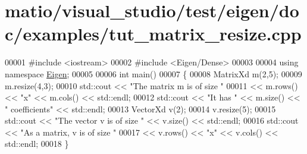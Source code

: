 \hypertarget{matio_2visual__studio_2test_2eigen_2doc_2examples_2tut__matrix__resize_8cpp_source}{}\section{matio/visual\+\_\+studio/test/eigen/doc/examples/tut\+\_\+matrix\+\_\+resize.cpp}
\label{matio_2visual__studio_2test_2eigen_2doc_2examples_2tut__matrix__resize_8cpp_source}

\begin{DoxyCode}
00001 \textcolor{preprocessor}{#include <iostream>}
00002 \textcolor{preprocessor}{#include <Eigen/Dense>}
00003 
00004 \textcolor{keyword}{using namespace }\hyperlink{namespace_eigen}{Eigen};
00005 
00006 \textcolor{keywordtype}{int} main()
00007 \{
00008   MatrixXd m(2,5);
00009   m.resize(4,3);
00010   std::cout << \textcolor{stringliteral}{"The matrix m is of size "}
00011             << m.rows() << \textcolor{stringliteral}{"x"} << m.cols() << std::endl;
00012   std::cout << \textcolor{stringliteral}{"It has "} << m.size() << \textcolor{stringliteral}{" coefficients"} << std::endl;
00013   VectorXd v(2);
00014   v.resize(5);
00015   std::cout << \textcolor{stringliteral}{"The vector v is of size "} << v.size() << std::endl;
00016   std::cout << \textcolor{stringliteral}{"As a matrix, v is of size "}
00017             << v.rows() << \textcolor{stringliteral}{"x"} << v.cols() << std::endl;
00018 \}
\end{DoxyCode}
